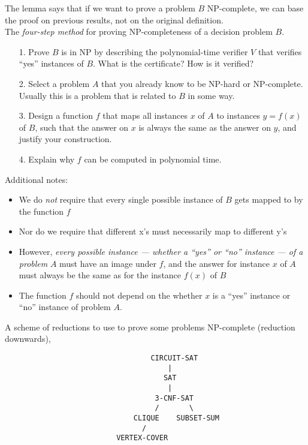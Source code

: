 \documentclass[12pt]{article}
\theoremstyle{plain}
\theoremstyle{definition}
\begin{document}
The lemma says that if we want to prove a problem $B$ NP-complete, we can base the proof on previous results, not on the original definition. \\
The \emph{four-step method} for proving NP-completeness of a decision problem $B$.
\begin{itemize}
  \item[1.] Prove $B$ is in NP by describing the polynomial-time verifier $V$ that verifies ``yes'' instances of $B$.
  What is the certificate?
  How is it verified?

  \item[2.] Select a problem $A$ that you already know to be NP-hard or NP-complete.
  Usually this is a problem that is related to $B$ in some way.

  \item[3.] Design a function $f$ that maps all instances $x$ of $A$ to instances $y = f(x)$ of $B$, such that the answer on $x$ is always the same as the answer on $y$, and justify your construction.

  \item[4.] Explain why $f$ can be computed in polynomial time.
\end{itemize}

Additional notes:
\begin{itemize}
  \item We do \emph{not} require that every single possible instance of $B$ gets  mapped to by the function $f$
  \item Nor do we require that different x's must necessarily map to different y's
  \item However, \emph{every possible instance --- whether a ``yes'' or ``no'' instance --- of a problem} $A$ must have an image under $f$, and the answer for instance $x$ of $A$ must always be the same as for the instance $f(x)$ of $B$
  \item The function $f$ should not depend on the whether $x$ is a ``yes'' instance or ``no'' instance of problem $A$.
\end{itemize}

A scheme of reductions to use to prove some problems NP-complete (reduction downwards),
\begin{verbatim}
                                  CIRCUIT-SAT
                                      |
                                     SAT
                                      |
                                   3-CNF-SAT
                                   /       \
                              CLIQUE    SUBSET-SUM
                                /
                          VERTEX-COVER
\end{verbatim}
\end{document}
